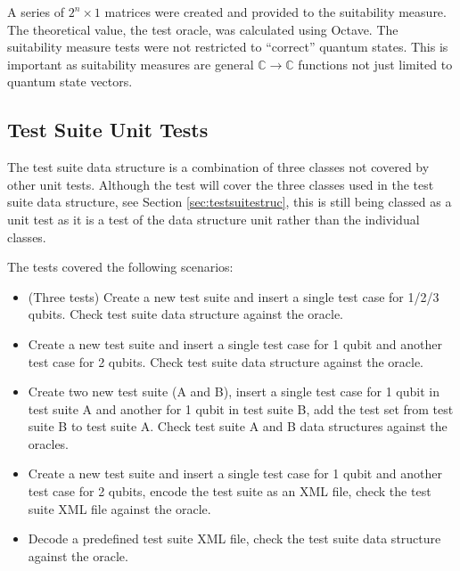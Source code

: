 A series of $2^n\times1$ matrices were created and provided to the suitability measure.
The theoretical value, the test oracle, was calculated using Octave\cite{octweb}.
The suitability measure tests were not restricted to ``correct'' quantum states.
This is important as suitability measures are general $\mathbb{C}\rightarrow\mathbb{C}$ functions not just limited to quantum state vectors.

\subsection{Test Suite Unit Tests}
\label{sec:testsuitetests}
The test suite data structure is a combination of three classes not covered by other unit tests.
Although the test will cover the three classes used in the test suite data structure, see Section \ref{sec:testsuitestruc}, this is still being classed as a unit test as it is a test of the data structure unit rather than the individual classes.

The tests covered the following scenarios:
\begin{itemize}
 \item (Three tests) Create a new test suite and insert a single test case for 1/2/3 qubits.
Check test suite data structure against the oracle.
 \item Create a new test suite and insert a single test case for 1 qubit and another test case for 2 qubits.
Check test suite data structure against the oracle.
 \item Create two new test suite (A and B), insert a single test case for 1 qubit in test suite A and another for 1 qubit in test suite B, add the test set from test suite B to test suite A. Check test suite A and B data structures against the oracles.
 \item Create a new test suite and insert a single test case for 1 qubit and another test case for 2 qubits, encode the test suite as an XML file, check the test suite XML file against the oracle.
 \item Decode a predefined test suite XML file, check the test suite data structure against the oracle.
\end{itemize}

